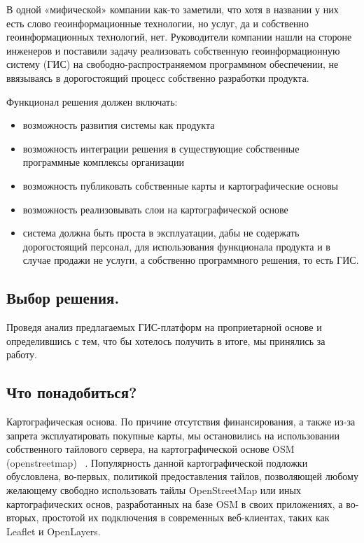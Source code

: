 \documentclass[10pt, a5paper]{article}
\begin{document}
В одной «мифической» компании как-то заметили, что хотя в названии у них есть слово геоинформационные технологии, но услуг, да и собственно  геоинформационных технологий, нет. Руководители компании нашли на стороне инженеров и поставили задачу реализовать собственную геоинформационную систему (ГИС) на свободно-распространяемом программном обеспечении, не ввязываясь в дорогостоящий процесс собственно разработки продукта.

Функционал решения должен включать:

\begin{itemize}
  \item возможность развития системы как продукта
  \item возможность интеграции решения в существующие собственные программные комплексы организации
  \item возможность публиковать собственные карты и картографические основы
  \item возможность реализовывать слои на картографической основе
  \item система должна быть проста в эксплуатации, дабы не содержать дорогостоящий персонал, для использования функционала продукта и в случае продажи не услуги, а собственно программного решения, то есть ГИС.
\end{itemize}

\subsection*{Выбор решения.}

Проведя анализ предлагаемых ГИС-платформ на проприетарной основе и определившись с тем, что бы хотелось получить в итоге, мы принялись за работу.

\subsection*{Что понадобиться?}

Картографическая основа. По причине отсутствия финансирования, а также из-за запрета эксплуатировать покупные карты, мы остановились на использовании собственного тайлового сервера, на картографической основе OSM (openstreetmap) ~\cite{Stepanov-7}. Популярность данной картографической подложки обусловлена,  во-первых, политикой предоставления тайлов, позволяющей любому желающему свободно использовать тайлы OpenStreetMap или иных картографических основ, разработанных на базе OSM в своих приложениях, а во-вторых, простотой их подключения в современных веб-клиентах, таких как Leaflet и OpenLayers.
\end{document}
